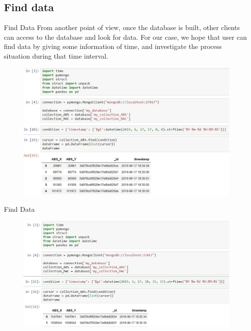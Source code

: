 \documentclass[11pt]{beamer}
\begin{document}
\subsection{Find data}
\begin{frame}{Find Data}
  From another point of view, once the database is built, other clients can access to the database and look for data. For our case, we hope that user can find data by giving some information of time, and investigate the process situation during that time interval.
  \begin{figure}
    \centering
    \includegraphics[scale=0.2]{query2.jpg}
  \end{figure}
\end{frame}

\begin{frame}{Find Data}
  \begin{figure}
    \centering
    \includegraphics[scale=0.28]{query1.jpg}
  \end{figure}
\end{frame}


\end{document}
